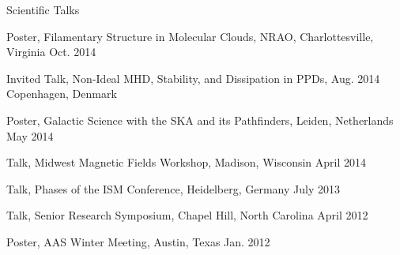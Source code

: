 \documentclass{resume_clark} %
\begin{document}
\begin{rSection}{Scientific Talks}
\begin{etaremune}[itemsep=-1.8mm]
\item Poster, Filamentary Structure in Molecular Clouds, NRAO, Charlottesville, Virginia \hfill {Oct. 2014}

\item Invited Talk, Non-Ideal MHD, Stability, and Dissipation in PPDs, \hfill {Aug. 2014} \\ Copenhagen, Denmark 

\item Poster, Galactic Science with the SKA and its Pathfinders, Leiden, Netherlands \hfill {May 2014}

\item Talk, Midwest Magnetic Fields Workshop, Madison, Wisconsin \hfill {April 2014}

\item Talk, Phases of the ISM Conference, Heidelberg, Germany \hfill {July 2013}

\item Talk, Senior Research Symposium, Chapel Hill, North Carolina \hfill {April 2012}

\item Poster, AAS Winter Meeting, Austin, Texas \hfill {Jan. 2012}


\end{etaremune}
\end{rSection}
\end{document}
